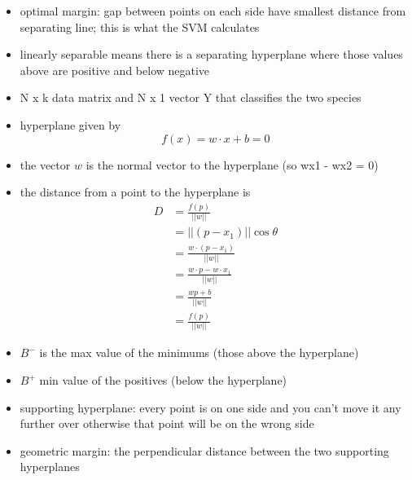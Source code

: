 \documentclass{article}
\begin{document}
\begin{itemize}
    \item optimal margin: gap between points on each side have smallest distance from separating line; this is what the SVM calculates
    \item linearly separable means there is a separating hyperplane where those values above are positive and below negative
    \item N x k data matrix and N x 1 vector Y that classifies the two species
    \item hyperplane given by $$f(x)=w \cdot x +b = 0$$
    \item the vector $w$ is the normal vector to the hyperplane (so wx1 - wx2 = 0)
    \item the distance from a point to the hyperplane is \begin{align*}
        D &= \frac{f(p)}{||w||} \\
        &= ||(p-x_1)||\cos{\theta} \\
        &= \frac{w \cdot (p-x_1)}{||w||}\\
        &=\frac{w \cdot p - w \cdot x_1}{||w||} \\
        &= \frac{wp + b}{||w||} \\
        &= \frac{f(p)}{||w||}
    \end{align*}
    \item $B^-$ is the max value of the minimums (those above the hyperplane)
    \item $B^+$ min value of the positives (below the hyperplane)
    \item supporting hyperplane: every point is on one side and you can't move it any further over otherwise that point will be on the wrong side
    \item geometric margin: the perpendicular distance between the two supporting hyperplanes
\end{itemize}
\end{document}
